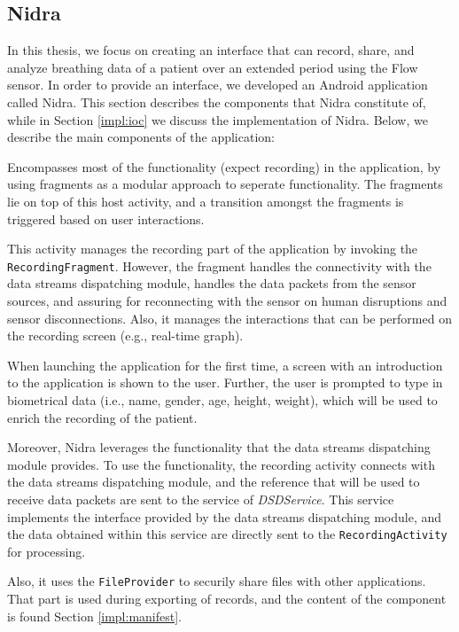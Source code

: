 \subsection{Nidra}
In this thesis, we focus on creating an interface that can record, share, and analyze breathing data of a patient over an extended period using the Flow sensor. In order to provide an interface, we developed an Android application called Nidra. This section describes the components that Nidra constitute of, while in Section \ref{impl:ioc} we discuss the implementation of Nidra. Below, we describe the main components of the application:
 
\begin{description}[font=\normalfont\itshape]
    \item[MainActivity:] Encompasses most of the functionality (expect recording) in the application, by using fragments as a modular approach to seperate functionality. The fragments lie on top of this host activity, and a transition amongst the fragments is triggered based on user interactions. 
    \item[RecordingActivity:] This activity manages the recording part of the application by invoking the \verb|RecordingFragment|. However, the fragment handles the connectivity with the data streams dispatching module, handles the data packets from the sensor sources, and assuring for reconnecting with the sensor on human disruptions and sensor disconnections. Also, it manages the interactions that can be performed on the recording screen (e.g., real-time graph).
    \item[LandingActivity:] When launching the application for the first time, a screen with an introduction to the application is shown to the user. Further, the user is prompted to type in biometrical data (i.e., name, gender, age, height, weight), which will be used to enrich the recording of the patient. 
\end{description}

Moreover, Nidra leverages the functionality that the data streams dispatching module provides. To use the functionality, the recording activity connects with the data streams dispatching module, and the reference that will be used to receive data packets are sent to the service of \textit{DSDService}. This service implements the interface provided by the data streams dispatching module, and the data obtained within this service are directly sent to the \verb|RecordingActivity| for processing. 

Also, it uses the \verb|FileProvider| to securily share files with other applications. That part is used during exporting of records, and the content of the component is found Section \ref{impl:manifest}.


